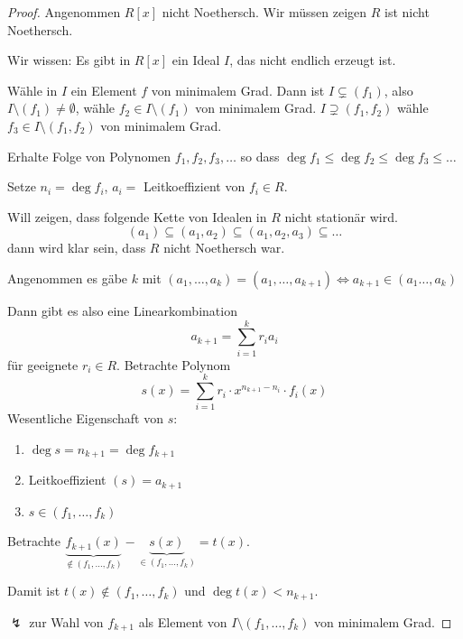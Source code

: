 \documentclass[12pt,parskip=full]{scrartcl}
\theoremstyle{definition}
\theoremstyle{remark}
\begin{document}
	\begin{proof}
		Angenommen $R[x]$ nicht Noethersch. Wir müssen zeigen $R$ ist nicht Noethersch.
		
		Wir wissen: Es gibt in $R[x]$ ein Ideal $I$, das nicht endlich erzeugt ist.
		
		Wähle in $I$ ein Element $f$ von minimalem Grad. Dann ist $I \subsetneq (f_1)$, also $I \setminus (f_1) \neq \emptyset$, wähle $f_2 \in I \setminus (f_1)$ von minimalem Grad. $I \supsetneq (f_1, f_2)$ wähle $f_3 \in I \setminus (f_1, f_2)$ von minimalem Grad.
		
		Erhalte Folge von Polynomen $f_1, f_2, f_3, \dots$ so dass $\deg f_1 \leq \deg f_2 \leq \deg f_3 \leq \dots$
		
		Setze $n_i = \deg f_i$, $a_i = $ Leitkoeffizient von $f_i \in R$.
		
		Will zeigen, dass folgende Kette von Idealen in $R$ nicht stationär wird.
		\begin{equation*}
			(a_1) \subseteq (a_1, a_2) \subseteq (a_1, a_2, a_3) \subseteq \dots
		\end{equation*}
		dann wird klar sein, dass $R$ nicht Noethersch war.
		
		Angenommen es gäbe $k$ mit $(a_1, \dots, a_k) = (a_1, \dots, a_{k+1}) \Leftrightarrow a_{k+1} \in (a_1 \dots, a_k)$
		
		Dann gibt es also eine Linearkombination
		\begin{equation*}
			a_{k+1} = \sum_{i = 1}^k r_i a_i
		\end{equation*}
		für geeignete $r_i \in R$. Betrachte Polynom
		\begin{equation*}
			s(x) = \sum_{i = 1}^k r_i \cdot x^{n_{k+1} - n_i} \cdot f_i(x)
		\end{equation*}
		Wesentliche Eigenschaft von $s$:
		\begin{enumerate}
			\item $\deg s = n_{k+1} = \deg f_{k+1}$
			\item Leitkoeffizient $(s) = a_{k+1}$
			\item $s \in (f_1, \dots, f_k)$
		\end{enumerate}
	
		Betrachte $\underbrace{f_{k+1}(x)}_{\notin (f_1, \dots, f_k)} - \underbrace{s(x)}_{\in (f_1, \dots, f_k)} = t(x)$.
		
		Damit ist $t(x) \notin (f_1, \dots, f_k)$ und $\deg t(x) < n_{k+1}$.
		
		$\lightning$ zur Wahl von $f_{k+1}$ als Element von $I \setminus (f_1, \dots, f_k)$ von minimalem Grad.
	\end{proof}
\end{document}
